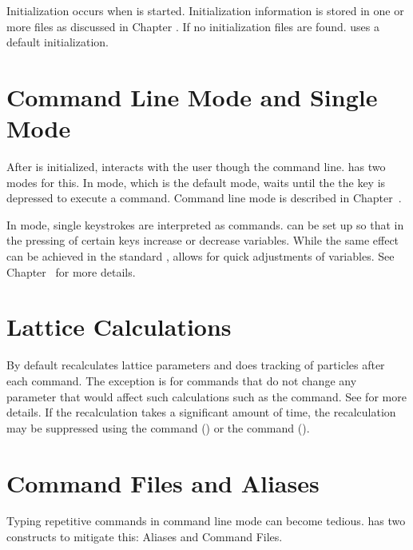 Initialization occurs when \tao is started. Initialization information is stored in one or more
files as discussed in Chapter . If no initialization files are found. \tao uses a
default initialization.

\section{Command Line Mode and Single Mode}
\label{s:modes}

After \tao is initialized, \tao interacts with the user though the command line. \tao has two modes
for this. In  mode, which is the default mode, \tao waits until the the 
key is depressed to execute a command. Command line mode is described in Chapter~. 

In  mode, single keystrokes are interpreted as commands. \tao can be set up so that in
 the pressing of certain keys increase or decrease variables. While the same effect
can be achieved in the standard ,  allows for quick adjustments of
variables. See Chapter~ for more details.

\section{Lattice Calculations}
\label{s:lat.calc.overview} 

By default \tao recalculates lattice parameters and does tracking of particles after each command.
The exception is for commands that do not change any parameter that would affect such calculations
such as the  command. See  for more details. If the recalculation takes a
significant amount of time, the recalculation may be suppressed using the  command () or the  command
().

\section{Command Files and Aliases}
\label{s:command.files} 

Typing repetitive commands in command line mode can become tedious. \tao has two constructs to
mitigate this: Aliases and Command Files. 

